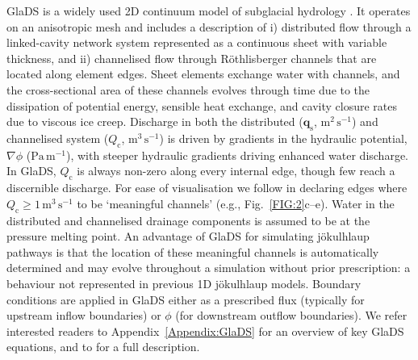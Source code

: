 \documentclass[tc, manuscript]{copernicus}
\begin{document}
GlaDS \citep{werder2013modeling} is a widely used  2D continuum model of subglacial hydrology \citep{dow2019role,mcarthur2023basal,hayden2023examining,hepburn2024organization,ehrenfeucht2025Antarctic}. It operates on an anisotropic mesh and includes a description of i) distributed flow through a linked-cavity network system represented as a continuous sheet with variable thickness, and ii) channelised flow through Röthlisberger channels that are located along element edges. Sheet elements exchange water with channels, and the cross-sectional area of these channels evolves through time due to the dissipation of potential energy, sensible heat exchange, and cavity closure rates due to viscous ice creep. Discharge in both the distributed ($\mathbf{q}_{\mathrm{s}}$, $\mathrm{m}^2\, \mathrm{s}^{-1}$) and channelised system ($Q_{\mathrm{c}}$, $\mathrm{m}^{3}\, \mathrm{s}^{-1}$) is driven by gradients in the hydraulic potential, $\nabla \phi$ ($\mathrm{Pa}\,\mathrm{m}^{-1}$), with steeper hydraulic gradients driving enhanced water discharge. In GlaDS, $Q_{\mathrm{c}}$ is always non-zero along every internal edge, though few reach a discernible discharge. For ease of visualisation we follow \citet{werder2013modeling} in declaring edges where $Q_{\mathrm{c}} \geq 1\, \mathrm{m}^{3}\, \mathrm{s}^{-1}$ to be `meaningful channels' (e.g., Fig.~\ref{FIG:2}c--e). Water in the distributed and channelised drainage components is assumed to be at the pressure melting point. An advantage of GlaDS for simulating jökulhlaup pathways is that the location of these meaningful channels is automatically determined and may evolve throughout a simulation without prior prescription: a behaviour not represented in previous 1D jökulhlaup models. Boundary conditions are applied in GlaDS either as a prescribed flux (typically for upstream inflow boundaries) or $\phi$ (for downstream outflow boundaries). We refer interested readers to Appendix~\ref{Appendix:GlaDS} for an overview of key GlaDS equations, and to \citet{werder2013modeling} for a full description.
\end{document}
